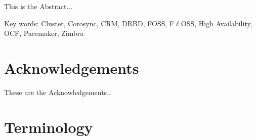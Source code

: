 \documentclass[a4paper, 12pt]{book}
\begin{document}
This is the Abstract...

\noindent
Key words: Cluster, Corosync, CRM, DRBD, FOSS, F$\ell$OSS, High Availability, OCF, Pacemaker, Zimbra

%
\chapter*{Acknowledgements}
\label{chap:acknowledgements}

These are the Acknowledgements..


%
\chapter*{Terminology}
\label{chap:terminology}
\end{document}
